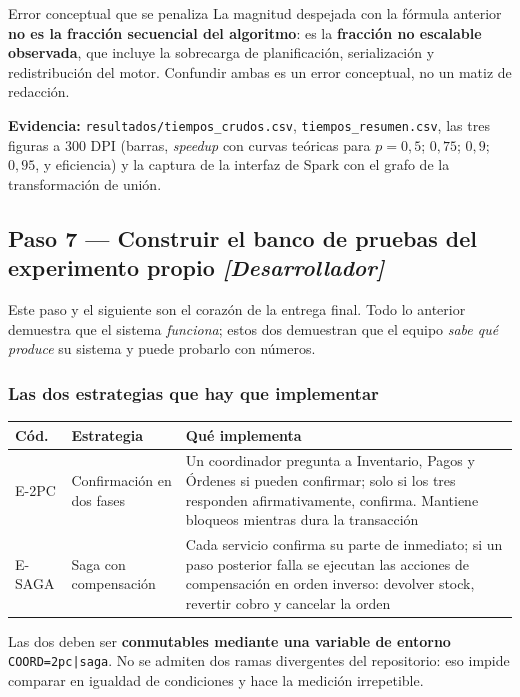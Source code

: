 \documentclass[11pt,a4paper]{article}
\newcommand{\paso}[1]{\subsection{#1}}
\begin{document}
	\begin{avisoBox}{Error conceptual que se penaliza}
		La magnitud despejada con la fórmula anterior \textbf{no es la fracción secuencial del algoritmo}: es la \textbf{fracción no escalable observada}, que incluye la sobrecarga de planificación, serialización y redistribución del motor. Confundir ambas es un error conceptual, no un matiz de redacción.
	\end{avisoBox}
	
	\textbf{Evidencia:} \texttt{resultados/tiempos\_crudos.csv}, \texttt{tiempos\_resumen.csv}, las tres figuras a 300 DPI (barras, \emph{speedup} con curvas teóricas para $p=0{,}5$; $0{,}75$; $0{,}9$; $0{,}95$, y eficiencia) y la captura de la interfaz de Spark con el grafo de la transformación de unión.
	
	\paso{Paso 7 --- Construir el banco de pruebas del experimento propio \emph{[Desarrollador]}}
	
	Este paso y el siguiente son el corazón de la entrega final. Todo lo anterior demuestra que el sistema \emph{funciona}; estos dos demuestran que el equipo \emph{sabe qué produce} su sistema y puede probarlo con números.
	
	\subsubsection{Las dos estrategias que hay que implementar}
	
	\begin{center}
		\small
		\begin{tabular}{@{}p{1.4cm}p{4.2cm}p{9.3cm}@{}}
			\toprule
			\textbf{Cód.} & \textbf{Estrategia} & \textbf{Qué implementa} \\
			\midrule
			E-2PC & Confirmación en dos fases & Un coordinador pregunta a Inventario, Pagos y Órdenes si pueden confirmar; solo si los tres responden afirmativamente, confirma. Mantiene bloqueos mientras dura la transacción \\
			\addlinespace
			E-SAGA & Saga con compensación & Cada servicio confirma su parte de inmediato; si un paso posterior falla se ejecutan las acciones de compensación en orden inverso: devolver stock, revertir cobro y cancelar la orden \\
			\bottomrule
		\end{tabular}
	\end{center}
	
	Las dos deben ser \textbf{conmutables mediante una variable de entorno} \texttt{COORD=2pc|saga}. No se admiten dos ramas divergentes del repositorio: eso impide comparar en igualdad de condiciones y hace la medición irrepetible.
	
\end{document}
